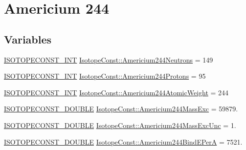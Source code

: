 \hypertarget{group___isotope_const-_americium-_am244}{}\section{Americium 244}
\label{group___isotope_const-_americium-_am244}
\subsection*{Variables}
\begin{DoxyCompactItemize}
\item 
\mbox{\hyperlink{group___isotope_const-_macros_ga5f18360b3e99483a35c32d789e62621c}{I\+S\+O\+T\+O\+P\+E\+C\+O\+N\+S\+T\+\_\+\+I\+NT}} \mbox{\hyperlink{group___isotope_const-_americium-_am244_ga4ffbd15c45ef9d6ca7e499085e2ac41c}{Isotope\+Const\+::\+Americium244\+Neutrons}} = 149
\item 
\mbox{\hyperlink{group___isotope_const-_macros_ga5f18360b3e99483a35c32d789e62621c}{I\+S\+O\+T\+O\+P\+E\+C\+O\+N\+S\+T\+\_\+\+I\+NT}} \mbox{\hyperlink{group___isotope_const-_americium-_am244_ga3c2073d2618f601e7504d32ac9575fde}{Isotope\+Const\+::\+Americium244\+Protons}} = 95
\item 
\mbox{\hyperlink{group___isotope_const-_macros_ga5f18360b3e99483a35c32d789e62621c}{I\+S\+O\+T\+O\+P\+E\+C\+O\+N\+S\+T\+\_\+\+I\+NT}} \mbox{\hyperlink{group___isotope_const-_americium-_am244_gaaa989d30e07b2144866e4c633fe78747}{Isotope\+Const\+::\+Americium244\+Atomic\+Weight}} = 244
\item 
\mbox{\hyperlink{group___isotope_const-_macros_ga8f45a7272ce02c0b4c65c44636ed719a}{I\+S\+O\+T\+O\+P\+E\+C\+O\+N\+S\+T\+\_\+\+D\+O\+U\+B\+LE}} \mbox{\hyperlink{group___isotope_const-_americium-_am244_gaa420a33ae9cdf60e59450751188f9a4b}{Isotope\+Const\+::\+Americium244\+Mass\+Exc}} = 59879.
\item 
\mbox{\hyperlink{group___isotope_const-_macros_ga8f45a7272ce02c0b4c65c44636ed719a}{I\+S\+O\+T\+O\+P\+E\+C\+O\+N\+S\+T\+\_\+\+D\+O\+U\+B\+LE}} \mbox{\hyperlink{group___isotope_const-_americium-_am244_ga042bdcbba4dcb0cfd633729357e1859d}{Isotope\+Const\+::\+Americium244\+Mass\+Exc\+Unc}} = 1.
\item 
\mbox{\hyperlink{group___isotope_const-_macros_ga8f45a7272ce02c0b4c65c44636ed719a}{I\+S\+O\+T\+O\+P\+E\+C\+O\+N\+S\+T\+\_\+\+D\+O\+U\+B\+LE}} \mbox{\hyperlink{group___isotope_const-_americium-_am244_gaa6688cb965c19f7f3af92a0218560fd8}{Isotope\+Const\+::\+Americium244\+Bind\+E\+PerA}} = 7521.
\item 

\end{DoxyCompactItemize}
